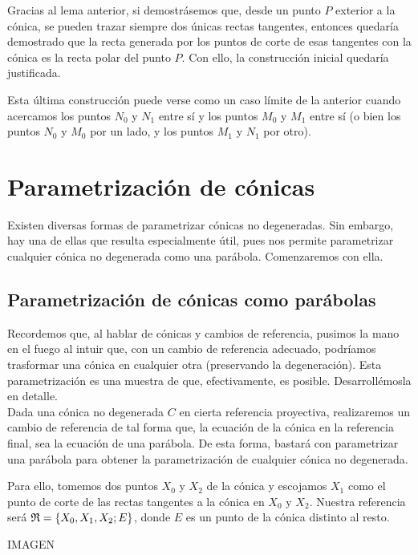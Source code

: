 Gracias al lema anterior, si demostrásemos que, desde un punto $P$ exterior a la cónica, se pueden trazar siempre dos únicas rectas tangentes, entonces quedaría demostrado que la recta generada por los puntos de corte de esas tangentes con la cónica es la recta polar del punto $P$. Con ello, la construcción inicial quedaría justificada.
\begin{obs}
	Esta última construcción puede verse como un caso límite de la anterior cuando acercamos los puntos $N_0$ y $N_1$ entre sí y los puntos $M_0$ y $M_1$ entre sí (o bien los puntos $N_0$ y $M_0$ por un lado, y los puntos $M_1$ y $N_1$ por otro).
\end{obs}

\section{Parametrización de cónicas}
Existen diversas formas de parametrizar cónicas no degeneradas. Sin embargo, hay una de ellas que resulta especialmente útil, pues nos permite parametrizar cualquier cónica no degenerada como una parábola. Comenzaremos con ella.
\subsection{Parametrización de cónicas como parábolas}
\label{C8_subsec_parametrizacion_como_parabola}
Recordemos que, al hablar de cónicas y cambios de referencia, pusimos la mano en el fuego al intuir que, con un cambio de referencia adecuado, podríamos trasformar una cónica en cualquier otra (preservando la degeneración). Esta parametrización es una muestra de que, efectivamente, es posible. Desarrollémosla en detalle.\\

Dada una cónica no degenerada $C$ en cierta referencia proyectiva, realizaremos un cambio de referencia de tal forma que, la ecuación de la cónica en la referencia final, sea la ecuación de una parábola. De esta forma, bastará con parametrizar una parábola para obtener la parametrización de cualquier cónica no degenerada.

Para ello, tomemos dos puntos $X_0$ y $X_2$ de la cónica y escojamos $X_1$ como el punto de corte de las rectas tangentes a la cónica en $X_0$ y $X_2$. Nuestra referencia será $\mathfrak{R}=\{X_0,X_1,X_2;E\}$, donde $E$ es un punto de la cónica distinto al resto.

IMAGEN

